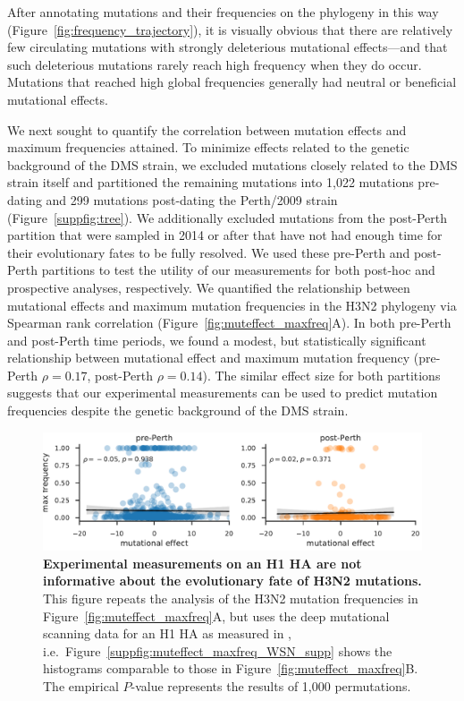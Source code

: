 \documentclass[9pt,twocolumn,twoside]{pnas-new}
\begin{document}
After annotating mutations and their frequencies on the phylogeny in this way (Figure~\ref{fig:frequency_trajectory}), it is visually obvious that there are relatively few circulating mutations with strongly deleterious mutational effects---and that such deleterious mutations rarely reach high frequency when they do occur.
Mutations that reached high global frequencies generally had neutral or beneficial mutational effects.

We next sought to quantify the correlation between mutation effects and maximum frequencies attained.
To minimize effects related to the genetic background of the DMS strain, we excluded mutations closely related to the DMS strain itself and partitioned the remaining mutations into 1,022 mutations pre-dating and 299 mutations post-dating the Perth/2009 strain (Figure~\ref{suppfig:tree}).
We additionally excluded mutations from the post-Perth partition that were sampled in 2014 or after that have not had enough time for their evolutionary fates to be fully resolved.
We used these pre-Perth and post-Perth partitions to test the utility of our measurements for both post-hoc and prospective analyses, respectively.
We quantified the relationship between mutational effects and maximum mutation frequencies in the H3N2 phylogeny via Spearman rank correlation (Figure~\ref{fig:muteffect_maxfreq}A).
In both pre-Perth and post-Perth time periods, we found a modest, but statistically significant relationship between mutational effect and maximum mutation frequency (pre-Perth $\rho = 0.17$, post-Perth $\rho = 0.14$).
The similar effect size for both partitions suggests that our experimental measurements can be used to predict mutation frequencies despite the genetic background of the DMS strain.

\begin{figure}[ht]
\centering
\includegraphics[width=1.0\textwidth]{figs/muteffect_by_maxfreq_WSN_1.pdf}
\caption{\label{fig:muteffect_maxfreq_WSN}
{\bf Experimental measurements on an H1 HA are not informative about the evolutionary fate of H3N2 mutations.}
This figure repeats the analysis of the H3N2 mutation frequencies in Figure~\ref{fig:muteffect_maxfreq}A, but uses the deep mutational scanning data for an H1 HA as measured in \cite{doud2016accurate}, i.e.\
Figure~\ref{suppfig:muteffect_maxfreq_WSN_supp} shows the histograms comparable to those in Figure~\ref{fig:muteffect_maxfreq}B.
The empirical $P$-value represents the results of 1,000 permutations.
}
\end{figure}
\end{document}
